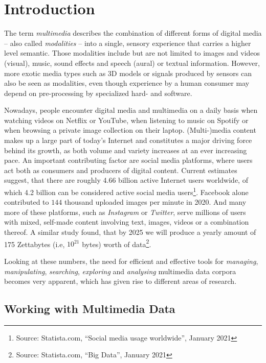 \chapter{Introduction}
The term \emph{multimedia} describes the combination of different forms of digital media -- also called \emph{modalities} -- into a single, sensory experience that carries a higher level semantic. Those modalities include but are not limited to images and videos (visual), music, sound effects and speech (aural) or textual information. However, more exotic media types such as 3D models or signals produced by sensors can also be seen as modalities, even though experience by a human consumer may depend on pre-processing by specialized hard- and software.

Nowadays, people encounter digital media and multimedia on a daily basis when watching videos on Netflix or YouTube, when listening to music on Spotify or when browsing a private image collection on their laptop. (Multi-)media content makes up a large part of today's Internet and constitutes a major driving force behind its growth, as both volume and variety increases at an ever increasing pace. An important contributing factor are social media platforms, where users act both as consumers and producers of digital content. Current estimates suggest, that there are roughly 4.66 billion active Internet users worldwide, of which 4.2 billion can be considered active social media users\footnote{Source: Statista.com, ``Social media usage worldwide'', January 2021}. Facebook alone contributed to $144$ thousand uploaded images per minute in 2020. And many more of these  platforms, such as \emph{Instagram} or \emph{Twitter}, serve millions of users with mixed, self-made content involving text, images, videos or a combination thereof. A similar study found, that by 2025 we will produce a yearly amount of 175 Zettabytes (i.e, $10^{21}$ bytes) worth of data\footnote{Source: Statista.com, ``Big Data'', January 2021}.

Looking at these numbers, the need for efficient and effective tools for \emph{managing}, \emph{manipulating}, \emph{searching}, \emph{exploring} and \emph{analysing} multimedia data corpora becomes very apparent, which has given rise to different areas of research.

\section{Working with Multimedia Data}

